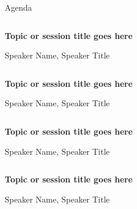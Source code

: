 \documentclass[aspectratio=169, t, 9pt]{beamer} %
\begin{document}
\begin{frame}[FloatingTitle]{Agenda}
\begin{groupcolumns}
    \hfill
    \begin{column}{0.4\textwidth}
    \end{column}
    \begin{column}{0.4\textwidth}
        \textbf{Topic or session title goes here}

        Speaker Name, Speaker Title
    \end{column}
    \hfill
\end{groupcolumns}
\vfill
\begin{groupcolumns}
    \hfill
    \begin{column}{0.4\textwidth}
    \end{column}
    \begin{column}{0.4\textwidth}
        \textbf{Topic or session title goes here}

        Speaker Name, Speaker Title
    \end{column}
    \hfill
\end{groupcolumns}
\vfill
\begin{groupcolumns}
    \hfill
    \begin{column}{0.4\textwidth}
    \end{column}
    \begin{column}{0.4\textwidth}
        \textbf{Topic or session title goes here}

        Speaker Name, Speaker Title
    \end{column}
    \hfill
\end{groupcolumns}
\vfill
\begin{groupcolumns}
    \hfill
    \begin{column}{0.4\textwidth}
    \end{column}
    \begin{column}{0.4\textwidth}
        \textbf{Topic or session title goes here}

        Speaker Name, Speaker Title
    \end{column}
    \hfill
\end{groupcolumns}
\end{frame}
\end{document}
